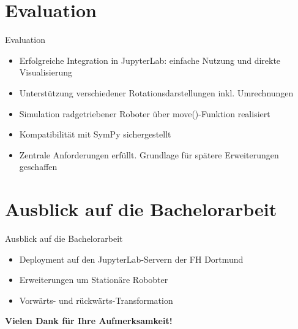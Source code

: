 \documentclass{beamer}
\begin{document}
\section{Evaluation}
\begin{frame}{Evaluation}
  \begin{itemize}
    \setlength{\itemsep}{1em}
    \item Erfolgreiche Integration in JupyterLab: einfache Nutzung und direkte Visualisierung
    \item Unterstützung verschiedener Rotationsdarstellungen inkl. Umrechnungen
    \item Simulation radgetriebener Roboter über move()-Funktion realisiert
    \item Kompatibilität mit SymPy sichergestellt
    \item Zentrale Anforderungen erfüllt. Grundlage für spätere Erweiterungen geschaffen
  \end{itemize}
\end{frame}




\section{Ausblick auf die Bachelorarbeit}
\begin{frame}{Ausblick auf die Bachelorarbeit}
  \begin{itemize}
    \setlength{\itemsep}{1em}
    \item Deployment auf den JupyterLab-Servern der FH Dortmund
    \item Erweiterungen um Stationäre Robobter
    \item Vorwärts- und rückwärts-Transformation
    
  \end{itemize}
\end{frame}


\begin{frame}{}
  \begin{center}
    \textbf{\huge Vielen Dank für Ihre Aufmerksamkeit!}  
  \end{center}
  
\end{frame}
\end{document}
